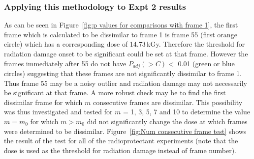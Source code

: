 \subsubsection{Applying this methodology to Expt 2 results}
\label{subs:Applying this methodology to Expt 2 results}
As can be seen in Figure~\ref{fig:p values for comparisons with frame 1}, the first frame which is calculated to be dissimilar to frame 1 is frame 55 (first orange circle) which has a corresponding dose of 14.73$\,$kGy.
Therefore the threshold for radiation damage onset to be significant could be set at that frame.
However the frames immediately after 55 do not have $P_{adj}(>C) <$ 0.01 (green or blue circles) suggesting that these frames are not significantly dissimilar to frame 1.
Thus frame 55 may be a noisy outlier and radiation damage may not necessarily be significant at that frame.
A more robust check may be to find the first dissimilar frame for which $m$ consecutive frames are dissimilar.
This possibility was thus investigated and tested for $m$ = 1, 3, 5, 7 and 10 to determine the value $m = m_0$ for which $m > m_0$ did not significantly change the dose at which frames were determined to be dissimilar.
Figure~\ref{fig:Num consecutive frame test} shows the result of the test for all of the radioprotectant experiments (note that the dose is used as the threshold for radiation damage instead of frame number).
